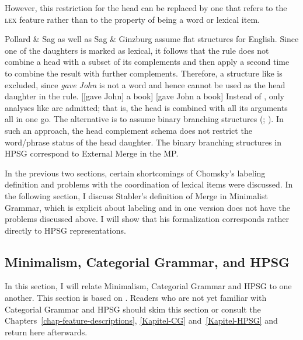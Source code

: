 However, this restriction for the head can be replaced by one that refers to the \textsc{lex} feature rather than
to the property of being a word or lexical item.

Pollard \& Sag as well as Sag \& Ginzburg assume flat structures for English. Since one of the daughters
is marked as lexical, it follows that the rule does not combine a head with a subset of its
complements and then apply a second time to combine the result with further complements. Therefore, a
structure like  is excluded, since \emph{gave John} is not a word and hence cannot be used
as the head daughter in the rule.
\eal
\ex\label{ex-gave-john-a-book-a} {}[[gave John] a book]
\ex\label{ex-gave-john-a-book-b} {}[gave John a book]
\zl
Instead of , only analyses like  are admitted; that is, the head is combined with
all its arguments all in one go. The alternative is to assume binary branching structures
(\citealp{MuellerHPSGHandbook}; \citealp[Section~1.2.2]{MOeDanish}). In such an approach, the head complement schema does
not restrict the word/phrase status of the head daughter. The binary branching structures in HPSG
correspond to External Merge in the MP.

In the previous two sections, certain shortcomings of Chomsky's labeling definition and problems
with the coordination of lexical items were discussed. In the following section, I discuss Stabler's definition of
Merge in Minimalist Grammar, which is explicit about labeling and in one version does not have the
problems discussed above. I will show that his formalization corresponds rather directly to HPSG
representations.

\subsection{Minimalism, Categorial Grammar, and HPSG}
\label{Abschnitt-MG}\label{sec-MG}

In this section, I will relate
Minimalism, Categorial Grammar and HPSG to one another. This section is based on . Readers who are not yet familiar with
Categorial Grammar and HPSG should skim this section or consult the  
Chapters~\ref{chap-feature-descriptions}, \ref{Kapitel-CG} and~\ref{Kapitel-HPSG} and return here afterwards.


